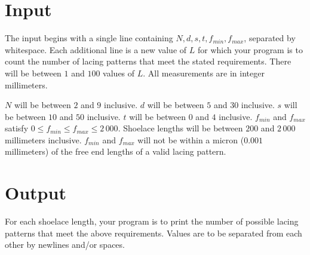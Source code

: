 \section*{Input}

The input begins with a single line containing $N, d, s, t, f_{min}, f_{max}$,
separated by whitespace.  Each additional line is a new value of $L$ for which
your program is to count the number of lacing patterns that meet the stated
requirements.  There will be between $1$ and $100$ values of $L$.
All measurements are in integer millimeters.
\par
$N$ will be between $2$ and $9$ inclusive.  $d$ will be between $5$ and $30$ inclusive.
$s$ will be between $10$ and $50$ inclusive.  $t$ will be between $0$ and $4$
inclusive.  $f_{min}$ and $f_{max}$ satisfy $0 \leq f_{min} \leq f_{max} \leq 2\,000$.
Shoelace lengths will be between $200$ and $2\,000$ millimeters
inclusive.  $f_{min}$ and $f_{max}$ will not be within a micron ($0.001$
millimeters) of the free end lengths of a valid lacing pattern.

\section*{Output}

For each shoelace length, your program is to print the number of possible
lacing patterns that meet the above requirements.
Values are to be separated from each other by newlines and/or spaces.

